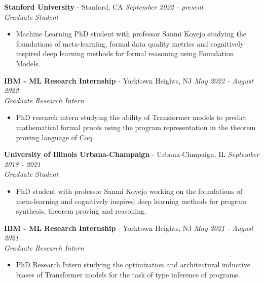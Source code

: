 \documentclass{article}
\newenvironment{changemargin}[2]{%
  \begin{list}{}{%
    \setlength{\topsep}{0pt}%
    \setlength{\leftmargin}{#1}%
    \setlength{\rightmargin}{#2}%
    \setlength{\listparindent}{\parindent}%
    \setlength{\itemindent}{\parindent}%
    \setlength{\parsep}{\parskip}%
  }%
  \item[]}{\end{list}
}
\newenvironment{body} {
	\vspace*{-16pt}
	\begin{changemargin}{-0.25in}{-0.5in}
  }	
	{\end{changemargin}
}
\begin{document}
\begin{body}
	\vspace{16pt}
 
        \textbf{Stanford University} - Stanford, CA \hfill \emph{September 2022 - present}\\
	\emph{Graduate Student}\\
	\vspace*{-3pt}
	\begin{itemize} \itemsep -2pt  %
		\item Machine Learning PhD student with professor Sanmi Koyejo studying the foundations of meta-learning, formal data quality metrics and cognitively inspired deep learning methods for formal reasoning using Foundation Models.
	\end{itemize}
	\vspace{5 pt}

	\textbf{IBM - ML Research Internship} - Yorktown Heights, NJ \hfill \emph{May 2022 - August 2022}\\
	\emph{Graduate Research Intern}\\
	\vspace*{-3pt}
	\begin{itemize} \itemsep -2pt  %
		\item PhD research intern studying the ability of Transformer models to predict mathematical formal proofs using the program representation in the theorem proving language of Coq.
	\end{itemize}

	\textbf{University of Illinois Urbana-Champaign} - Urbana-Chmpaign, IL \hfill \emph{September 2018 - 2021}\\
	\emph{Graduate Student}\\
	\vspace*{-3pt}
	\begin{itemize} \itemsep -2pt  %
		\item PhD student with professor Sanmi Koyejo working on the foundations of meta-learning and cognitively inspired deep learning methods for program synthesis, theorem proving and reasoning.
	\end{itemize}
	\vspace{5 pt}
	
	\textbf{IBM - ML Research Internship} - Yorktown Heights, NJ \hfill \emph{May 2021 - August 2021}\\
	\emph{Graduate Research Intern}\\
	\vspace*{-3pt}
	\begin{itemize} \itemsep -2pt  %
		\item PhD Research Intern studying the optimization and architectural inductive biases of Transformer models for the task of type inference of programs. 
	\end{itemize}
	\vspace{5 pt}


\end{body}
\end{document}

